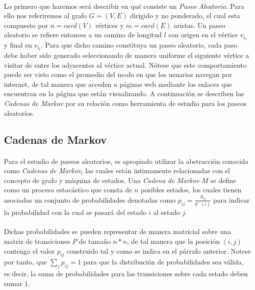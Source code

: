 \documentclass{subfiles}
\begin{document}
      \paragraph{}
      Lo primero que haremos será describir en qué consiste un \emph{Paseo Aleatorio}. Para ello nos referiremos al grafo $G=(V,E)$ dirigido y no ponderado, el cual esta compuesto por $n = card(V)$ vértices y $m=card(E)$ aristas. Un paseo aleatorio se refiere entonces a un camino de longitud $l$ con origen en el vértice $v_{i_1}$ y final en $v_{i_l}$. Para que dicho camino constituya un paseo aleatorio, cada paso debe haber sido generado seleccionando de manera uniforme el siguiente vértice a visitar de entre los adyacentes al vértice actual. Nótese que este comportamiento puede ser visto como el promedio del modo en que los usuarios navegan por internet, de tal manera que acceden a páginas web mediante los enlaces que encuentran en la página que están visualizando. A continuación se describen las \emph{Cadenas de Markov} por su relación como herramienta de estudio para los paseos aleatorios.


      \subsection{Cadenas de Markov}
      \label{sec:markov_chains}

        \paragraph{}
        Para el estudio de paseos aleatorios, es apropiado utilizar la abstracción conocida como \emph{Cadenas de Markov}, las cuales están intimamente relacionadas con el concepto de grafo y máquina de estados. Una \emph{Cadena de Markov} $M$ se define como un proceso estocástico que consta de $n$ posibles estados, los cuales tienen asociadas un conjunto de probabilidades denotadas como $p_{ij}=\frac{A_{ij}}{d^-(i)}$ para indicar la probabilidad con la cual se pasará del estado $i$ al estado $j$.

        \paragraph{}
        Dichas probabilidades se pueden representar de manera matricial sobre una matriz de transiciones $P$ de tamaño $n*n$, de tal manera que la posición $(i,j)$ contenga el valor $p_{ij}$ construido tal y como se indica en el párrafo anterior. Notese por tanto, que $\sum_{j}p_{ij}=1$ para que la distribución de probabilidades sea válida, es decir, la suma de probabilidades para las transiciones sobre cada estado deben sumar $1$.
\end{document}
